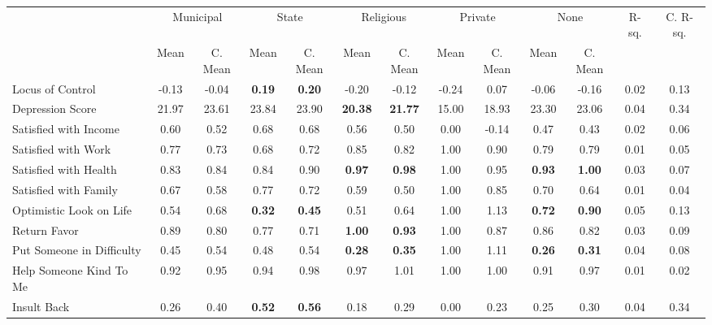\begin{tabular}{l c c c c c c c c c c c c}
\toprule
& \multicolumn{2}{c}{Municipal} & \multicolumn{2}{c}{State} & \multicolumn{2}{c}{Religious} & \multicolumn{2}{c}{Private} & \multicolumn{2}{c}{None} & R-sq. & C. R-sq. \\
& \scriptsize Mean & \scriptsize C. Mean & \scriptsize Mean & \scriptsize C. Mean & \scriptsize Mean & \scriptsize C. Mean & \scriptsize Mean & \scriptsize C. Mean & \scriptsize Mean & \scriptsize C. Mean & & \\
\midrule
Locus of Control &     -0.13 & -0.04 & \textbf{     0.19} & \textbf{     0.20} &     -0.20 & -0.12 &     -0.24 & 0.07 &     -0.06 & -0.16 &      0.02 &      0.13 \\
Depression Score &     21.97 & 23.61 &     23.84 & 23.90 & \textbf{    20.38} & \textbf{    21.77} &     15.00 & 18.93 &     23.30 & 23.06 &      0.04 &      0.34 \\
Satisfied with Income &      0.60 & 0.52 &      0.68 & 0.68 &      0.56 & 0.50 &      0.00 & -0.14 &      0.47 & 0.43 &      0.02 &      0.06 \\
Satisfied with Work &      0.77 & 0.73 &      0.68 & 0.72 &      0.85 & 0.82 &      1.00 & 0.90 &      0.79 & 0.79 &      0.01 &      0.05 \\
Satisfied with Health &      0.83 & 0.84 &      0.84 & 0.90 & \textbf{     0.97} & \textbf{     0.98} &      1.00 & 0.95 & \textbf{     0.93} & \textbf{     1.00} &      0.03 &      0.07 \\
Satisfied with Family &      0.67 & 0.58 &      0.77 & 0.72 &      0.59 & 0.50 &      1.00 & 0.85 &      0.70 & 0.64 &      0.01 &      0.04 \\
Optimistic Look on Life &      0.54 & 0.68 & \textbf{     0.32} & \textbf{     0.45} &      0.51 & 0.64 &      1.00 & 1.13 & \textbf{     0.72} & \textbf{     0.90} &      0.05 &      0.13 \\
Return Favor &      0.89 & 0.80 &      0.77 & 0.71 & \textbf{     1.00} & \textbf{     0.93} &      1.00 & 0.87 &      0.86 & 0.82 &      0.03 &      0.09 \\
Put Someone in Difficulty &      0.45 & 0.54 &      0.48 & 0.54 & \textbf{     0.28} & \textbf{     0.35} &      1.00 & 1.11 & \textbf{     0.26} & \textbf{     0.31} &      0.04 &      0.08 \\
Help Someone Kind To Me &      0.92 & 0.95 &      0.94 & 0.98 &      0.97 & 1.01 &      1.00 & 1.00 &      0.91 & 0.97 &      0.01 &      0.02 \\
Insult Back &      0.26 & 0.40 & \textbf{     0.52} & \textbf{     0.56} &      0.18 & 0.29 &      0.00 & 0.23 &      0.25 & 0.30 &      0.04 &      0.34 \\
\bottomrule
\end{tabular}
